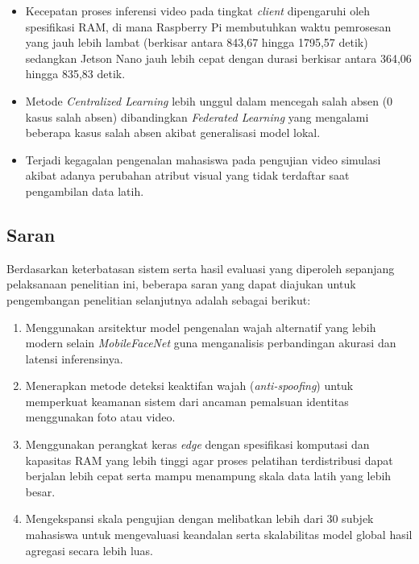 \documentclass[conference]{IEEEtran}
\begin{document}
\begin{enumerate}
\begin{itemize}
        \item Kecepatan proses inferensi video pada tingkat \textit{client} dipengaruhi oleh spesifikasi RAM, di mana Raspberry Pi membutuhkan waktu pemrosesan yang jauh lebih lambat (berkisar antara 843,67 hingga 1795,57 detik) sedangkan Jetson Nano jauh lebih cepat dengan durasi berkisar antara 364,06 hingga 835,83 detik.
        \item Metode \textit{Centralized Learning} lebih unggul dalam mencegah salah absen (0 kasus salah absen) dibandingkan \textit{Federated Learning} yang mengalami beberapa kasus salah absen akibat generalisasi model lokal.
        \item Terjadi kegagalan pengenalan mahasiswa pada pengujian video simulasi akibat adanya perubahan atribut visual yang tidak terdaftar saat pengambilan data latih.
    \end{itemize}
\end{enumerate}

\subsection{Saran}
Berdasarkan keterbatasan sistem serta hasil evaluasi yang diperoleh sepanjang pelaksanaan penelitian ini, beberapa saran yang dapat diajukan untuk pengembangan penelitian selanjutnya adalah sebagai berikut:
\begin{enumerate}
    \item Menggunakan arsitektur model pengenalan wajah alternatif yang lebih modern selain \textit{MobileFaceNet} guna menganalisis perbandingan akurasi dan latensi inferensinya.
    \item Menerapkan metode deteksi keaktifan wajah (\textit{anti-spoofing}) untuk memperkuat keamanan sistem dari ancaman pemalsuan identitas menggunakan foto atau video.
    \item Menggunakan perangkat keras \textit{edge} dengan spesifikasi komputasi dan kapasitas RAM yang lebih tinggi agar proses pelatihan terdistribusi dapat berjalan lebih cepat serta mampu menampung skala data latih yang lebih besar.
    \item Mengekspansi skala pengujian dengan melibatkan lebih dari 30 subjek mahasiswa untuk mengevaluasi keandalan serta skalabilitas model global hasil agregasi secara lebih luas.
\end{enumerate}
\end{document}
